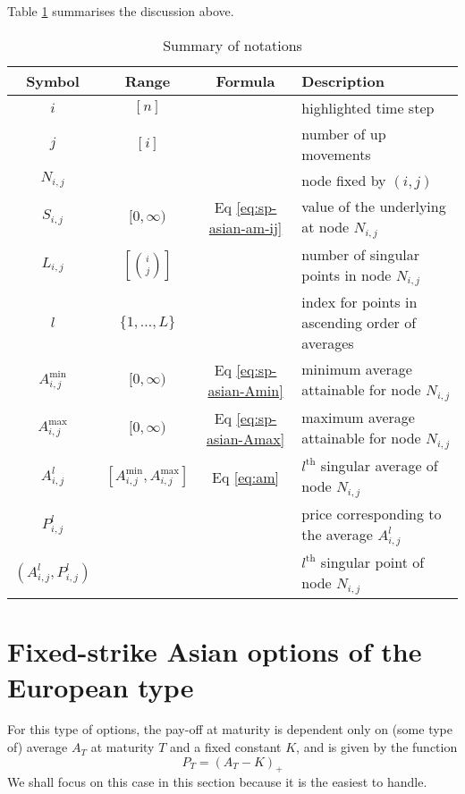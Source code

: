 Table \ref{tab:sp-asian-notations} summarises the discussion above.

\begin{table}[h]
	\label{tab:sp-asian-notations}
	\centering
	\caption{Summary of notations}
	\begin{tabular}{cccl}
		\toprule
		Symbol & Range & Formula & Description \\
		\midrule
		$ i $ & $ [ n ] $ & & highlighted time step \\
		$ j $ & $ [ i ] $ & & number of up movements \\
		$ N_{i,j} $ & & & node fixed by $ (i,j) $ \\
		$ S_{i,j} $ & $ [0, \infty) $ & Eq \ref{eq:sp-asian-am-ij} & value of the underlying at node $ N_{i,j} $ \\
		$ L_{i,j} $ & $ \left[ \binom{i}{j} \right] $ & & number of singular points in node $ N_{i,j} $ \\
		$ l $ & $ \{ 1, \dots, L \} $ & & index for points in ascending order of averages \\
		$ A_{i,j}^{\min} $ & $ [0, \infty) $ & Eq \ref{eq:sp-asian-Amin} & minimum average attainable for node $ N_{i,j} $ \\
		$ A_{i,j}^{\max} $ & $ [0, \infty) $ & Eq \ref{eq:sp-asian-Amax} & maximum average attainable for node $ N_{i,j} $ \\
		$ A_{i,j}^l $ & $ \left[ A_{i,j}^{\min}, A_{i,j}^{\max} \right] $ & Eq \ref{eq:am} & $ l^\mathrm{th} $ singular average of node $ N_{i,j} $ \\
		$ P_{i,j}^l $ & & & price corresponding to the average $ A_{i,j}^l $ \\
		$ (A_{i,j}^l, P_{i,j}^l) $ & & & $ l^\mathrm{th} $ singular point of node $ N_{i,j} $ \\
		\bottomrule
	\end{tabular}
\end{table}



\section{Fixed-strike Asian options of the European type}
\label{sec:fixed-strike-eu}

For this type of options, the pay-off at maturity is dependent only on (some type of) average $ A_T $ at maturity $T$ and a fixed constant $K$, and is given by the function
\begin{equation} \label{eq:sp-asian-price-eu-asian-am}
	P_T = (A_T - K)_+
\end{equation}
We shall focus on this case in this section because it is the easiest to handle.

